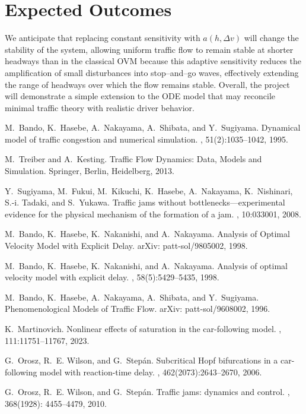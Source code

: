 \documentclass[12pt]{article}
\begin{document}
\section{Expected Outcomes}
We anticipate that replacing constant sensitivity with $a(h,\Delta v)$ will change the stability of the system, allowing uniform traffic flow to remain stable at shorter headways than in the classical OVM because this adaptive sensitivity reduces the amplification of small disturbances into stop–and–go waves, effectively extending the range of headways over which the flow remains stable. Overall, the project will demonstrate a simple extension to the ODE model that may reconcile minimal traffic theory with realistic driver behavior.

\newpage
\begin{thebibliography}{10}

M.~Bando, K.~Hasebe, A.~Nakayama, A.~Shibata, and Y.~Sugiyama.
\newblock Dynamical model of traffic congestion and numerical simulation.
, 51(2):1035--1042, 1995.

M.~Treiber and A.~Kesting.
\newblock Traffic Flow Dynamics: Data, Models and Simulation.
\newblock Springer, Berlin, Heidelberg, 2013.

Y.~Sugiyama, M.~Fukui, M.~Kikuchi, K.~Hasebe, A.~Nakayama, K.~Nishinari,
	S.-i. Tadaki, and S.~Yukawa.
\newblock Traffic jams without bottlenecks—experimental evidence for the
	physical mechanism of the formation of a jam.
, 10:033001, 2008.

M.~Bando, K.~Hasebe, K.~Nakanishi, and A.~Nakayama.
\newblock Analysis of Optimal Velocity Model with Explicit Delay.
\newblock arXiv: patt-sol/9805002, 1998.

M.~Bando, K.~Hasebe, K.~Nakanishi, and A.~Nakayama.
\newblock Analysis of optimal velocity model with explicit delay.
, 58(5):5429--5435, 1998.

M.~Bando, K.~Hasebe, A.~Nakayama, A.~Shibata, and Y.~Sugiyama.
\newblock Phenomenological Models of Traffic Flow.
\newblock arXiv: patt-sol/9608002, 1996.

K.~Martinovich.
\newblock Nonlinear effects of saturation in the car-following model.
, 111:11751--11767, 2023.

G.~Orosz, R.~E. Wilson, and G.~Step{\'a}n.
\newblock Subcritical Hopf bifurcations in a car-following model with
	reaction-time delay.
, 462(2073):2643--2670, 2006.

G.~Orosz, R.~E. Wilson, and G.~Step{\'a}n.
\newblock Traffic jams: dynamics and control.
, 368(1928):
	4455--4479, 2010.

\end{thebibliography}
\end{document}
